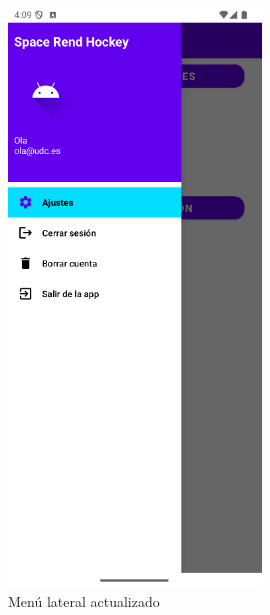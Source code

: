 \documentclass[a4paper,openright,12pt]{article}
\begin{document}
\begin{figure}[htp]
\begin{minipage}{0.3\textwidth}
        \includegraphics[width=0.6\textwidth]{Images/Vista_It4_4.png} 
        \caption{Menú lateral actualizado}
        \label{fig:menú lateral actualizado}
    \end{minipage}
    \hfill
    \begin{minipage}{0.3\textwidth}
        \centering

\end{minipage}
\end{figure}
\end{document}
